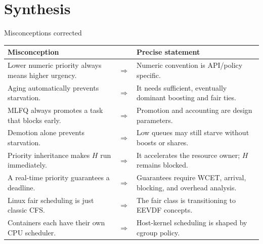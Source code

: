 \documentclass[aspectratio=169,11pt]{beamer}
\begin{document}
\section{Synthesis}

\begin{frame}{Misconceptions corrected}
  \scriptsize
  \begin{tabularx}{\textwidth}{@{}XcX@{}}
    \toprule
    \textbf{Misconception} & & \textbf{Precise statement} \\
    \midrule
    Lower numeric priority always means higher urgency. & $\Rightarrow$ & Numeric convention is API/policy specific. \\
    Aging automatically prevents starvation. & $\Rightarrow$ & It needs sufficient, eventually dominant boosting and fair ties. \\
    MLFQ always promotes a task that blocks early. & $\Rightarrow$ & Promotion and accounting are design parameters. \\
    Demotion alone prevents starvation. & $\Rightarrow$ & Low queues may still starve without boosts or shares. \\
    Priority inheritance makes $H$ run immediately. & $\Rightarrow$ & It accelerates the resource owner; $H$ remains blocked. \\
    A real-time priority guarantees a deadline. & $\Rightarrow$ & Guarantees require WCET, arrival, blocking, and overhead analysis. \\
    Linux fair scheduling is just classic CFS. & $\Rightarrow$ & The fair class is transitioning to EEVDF concepts. \\
    Containers each have their own CPU scheduler. & $\Rightarrow$ & Host-kernel scheduling is shaped by cgroup policy. \\
    \bottomrule
  \end{tabularx}
\end{frame}
\end{document}
